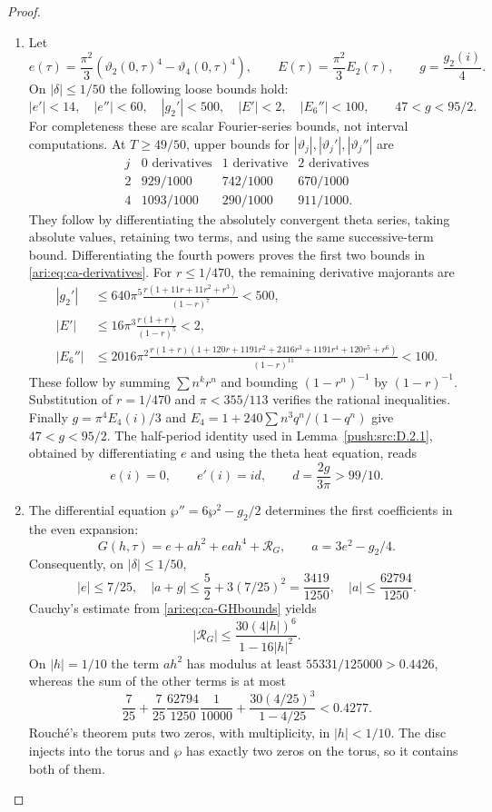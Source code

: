 \begin{proof}
\begin{enumerate}[label=\arabic*.,leftmargin=*]
\item Let
\[
 e(\tau)=\frac{\pi^2}{3}(\vartheta_2(0,\tau)^4-
                              \vartheta_4(0,\tau)^4),\qquad
 E(\tau)=\frac{\pi^2}{3}E_2(\tau),\qquad
 g=\frac{g_2(i)}4.
\]
On $|\delta|\le1/50$ the following loose bounds hold:
\begin{equation}\label{ari:eq:ca-derivatives}
 |e'|<14,\quad |e''|<60,\quad |g_2'|<500,
 \quad |E'|<2,\quad |E_6''|<100,
 \qquad 47<g<95/2.
\end{equation}
For completeness these are scalar Fourier-series bounds, not
interval computations. At $T\ge49/50$, upper bounds for
$|\vartheta_j|,|\vartheta_j'|,|\vartheta_j''|$ are
\[
\begin{array}{c|ccc}
j&0\text{ derivatives}&1\text{ derivative}&2\text{ derivatives}\\ \hline
2&929/1000&742/1000&670/1000\\
4&1093/1000&290/1000&911/1000.
\end{array}
\]
They follow by differentiating the absolutely convergent theta
series, taking absolute values, retaining two terms, and using
the same successive-term bound. Differentiating the fourth
powers proves the first two bounds in \eqref{ari:eq:ca-derivatives}.
For $r\le1/470$, the remaining derivative majorants are
\begin{align*}
 |g_2'|&\le640\pi^5\frac{r(1+11r+11r^2+r^3)}{(1-r)^7}<500,\\
 |E'|&\le16\pi^3\frac{r(1+r)}{(1-r)^5}<2,\\
 |E_6''|&\le2016\pi^2
 \frac{r(1+r)(1+120r+1191r^2+2416r^3+1191r^4+120r^5+r^6)}
 {(1-r)^{11}}<100.
\end{align*}
These follow by summing $\sum n^k r^n$ and bounding
$(1-r^n)^{-1}$ by $(1-r)^{-1}$. Substitution of $r=1/470$
and $\pi<355/113$ verifies the rational inequalities.
Finally $g=\pi^4E_4(i)/3$ and
$E_4=1+240\sum n^3q^n/(1-q^n)$ give $47<g<95/2$.
The half-period identity used in Lemma~\ref{push:src:D.2.1},
obtained by differentiating $e$ and using the theta heat equation, reads
\[
 e(i)=0,\qquad e'(i)=id,\qquad d=\frac{2g}{3\pi}>99/10.
\]

\item The differential equation $\wp''=6\wp^2-g_2/2$ determines the
first coefficients in the even expansion:
\[
 G(h,\tau)=e+a h^2+ea h^4+\mathcal R_G,
 \qquad a=3e^2-g_2/4.
\]
Consequently, on $|\delta|\le1/50$,
\[
 |e|\le7/25,\quad |a+g|\le\frac52+3(7/25)^2=\frac{3419}{1250},
 \quad |a|\le\frac{62794}{1250}.
\]
Cauchy's estimate from \eqref{ari:eq:ca-GHbounds} yields
\[
 |\mathcal R_G|\le
 \frac{30(4|h|)^6}{1-16|h|^2}.
\]
On $|h|=1/10$ the term $ah^2$ has modulus at least
$55331/125000>0.4426$, whereas the sum of the other terms is at most
\[
 \frac7{25}+\frac7{25}\frac{62794}{1250}\frac1{10000}
       +\frac{30(4/25)^3}{1-4/25}<0.4277.
\]
Rouch\'e's theorem puts two zeros, with multiplicity, in
$|h|<1/10$. The disc injects into the torus and $\wp$ has exactly
two zeros on the torus, so it contains both of them.


\end{enumerate}
\end{proof}
